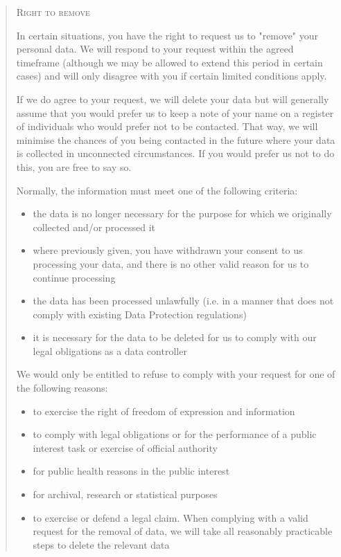 \documentclass[twocolumn, letterpaper,13pt]{scrartcl}
\begin{document}
\begin{quote}
        \textsc{Right to remove}
        
        In certain situations, you have the right to request us to "remove" your personal data. We will respond to your request within the agreed timeframe (although we may be allowed to extend this period in certain cases) and will only disagree with you if certain limited conditions apply.
        
        If we do agree to your request, we will delete your data but will generally assume that you would prefer us to keep a note of your name on a register of individuals who would prefer not to be contacted. That way, we will minimise the chances of you being contacted in the future where your data is collected in unconnected circumstances. If you would prefer us not to do this, you are free to say so.
        
        Normally, the information must meet one of the following criteria:
        \begin{itemize}
            \item the data is no longer necessary for the purpose for which we originally collected and/or processed it
            \item where previously given, you have withdrawn your consent to us processing your data, and there is no other valid reason for us to continue processing
            \item the data has been processed unlawfully (i.e. in a manner that does not comply with existing Data Protection regulations)
            \item it is necessary for the data to be deleted for us to comply with our legal obligations as a data controller
        \end{itemize}
        
        We would only be entitled to refuse to comply with your request for one of the following reasons:
        
        \begin{itemize}
            \item to exercise the right of freedom of expression and information
            \item to comply with legal obligations or for the performance of a public interest task or exercise of official authority
            \item for public health reasons in the public interest
            \item for archival, research or statistical purposes
            \item to exercise or defend a legal claim. When complying with a valid request for the removal of data, we will take all reasonably practicable steps to delete the relevant data
        \end{itemize}
        

\end{quote}
\end{document}
